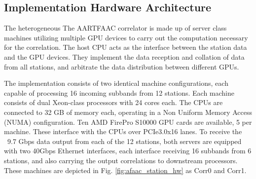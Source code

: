 \documentclass{ws-jai}
\begin{document}
\subsection  {Implementation  Hardware  Architecture} 
The heterogeneous  The AARTFAAC correlator  is made  up of server  class machines
utilizing multiple  GPU devices to carry  out the computation necessary  for the
correlation.  The  host CPU acts as  the interface between the  station data and
the GPU devices.   They implement the data reception and  collation of data from
all stations, and arbitrate the data distribution between different GPUs.







The  implementation  consists  of  two identical  machine  configurations,  each
capable  of processing  16  incoming  subbands from  12  stations. Each  machine
consists  of  dual Xeon-class  processors  with  24  cores  each. The  CPUs  are
connected to  32 GB  of memory each,  operating in a  Non Uniform  Memory Access
(NUMA) configuration.   Ten AMD FirePro  S10000 GPU  cards are available,  5 per
machine. These  interface with the  CPUs over  PCIe3.0x16 lanes. To  receive the
~9.7 Gbps data  output from each of  the 12 stations, both  servers are equipped
with two 40Gbps Ethernet interfaces, each interface receiving 16 subbands from 6
stations,   and   also   carrying   the  output   correlations   to   downstream
processors. These  machines are  depicted in Fig.  \ref{fig:afaac_station_hw} as
Corr0 and Corr1.\\
\end{document}
